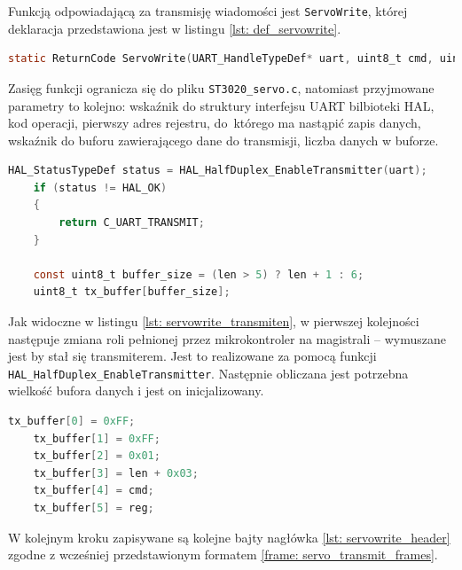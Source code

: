 Funkcją odpowiadającą za transmisję wiadomości jest \texttt{ServoWrite}, której deklaracja przedstawiona jest w listingu \ref{lst: def_servowrite}.
\begin{lstlisting}[language=C,
caption={Deklaracja funkcji \texttt{ServoWrite}},
label={lst: def_servowrite}]
    static ReturnCode ServoWrite(UART_HandleTypeDef* uart, uint8_t cmd, uint8_t reg, uint8_t *data_buffer, uint8_t len)
\end{lstlisting}
Zasięg funkcji ogranicza się do pliku \texttt{ST3020\_servo.c}, natomiast przyjmowane parametry to kolejno: wskaźnik do struktury interfejsu UART bilbioteki HAL, kod operacji, pierwszy adres rejestru, do~którego ma nastąpić zapis danych, wskaźnik do buforu zawierającego dane do transmisji, liczba danych w buforze.
\begin{lstlisting}[language=C,
caption={Początek funkcji \texttt{ServoWrite}},
label={lst: servowrite_transmiten}]
    HAL_StatusTypeDef status = HAL_HalfDuplex_EnableTransmitter(uart);
    if (status != HAL_OK)
    {
        return C_UART_TRANSMIT;
    }
    
    const uint8_t buffer_size = (len > 5) ? len + 1 : 6;
    uint8_t tx_buffer[buffer_size];
\end{lstlisting}
Jak widoczne w listingu \ref{lst: servowrite_transmiten}, w pierwszej kolejności następuje zmiana roli pełnionej przez mikrokontroler na magistrali -- wymuszane jest by stał się transmiterem. Jest to realizowane za pomocą funkcji \texttt{HAL\_HalfDuplex\_EnableTransmitter}. Następnie obliczana jest potrzebna wielkość bufora danych i jest on inicjalizowany.
\begin{lstlisting}[language=C,
caption={Fragment \texttt{ServoWrite} odpowiadający za uzupełnienie treści nagłówka},
label={lst: servowrite_header}]
    tx_buffer[0] = 0xFF;
    tx_buffer[1] = 0xFF;
    tx_buffer[2] = 0x01;		
    tx_buffer[3] = len + 0x03;	
    tx_buffer[4] = cmd;		    
    tx_buffer[5] = reg;			
\end{lstlisting}
W kolejnym kroku zapisywane są kolejne bajty nagłówka \ref{lst: servowrite_header} zgodne z wcześniej przedstawionym formatem \ref{frame: servo_transmit_frames}.

